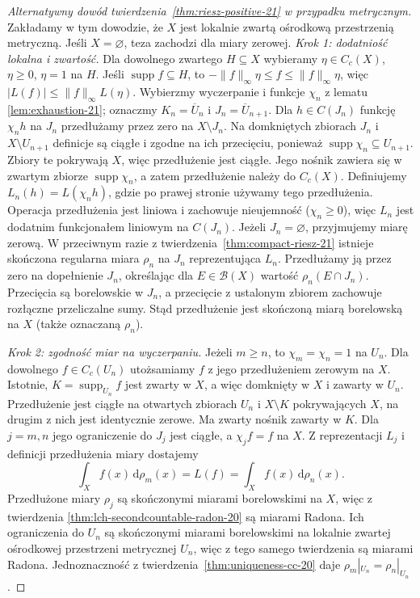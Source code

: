 \begin{proof}[Alternatywny dowód twierdzenia~\ref{thm:riesz-positive-21} w przypadku metrycznym]
Zakładamy w tym dowodzie, że $X$ jest lokalnie zwartą ośrodkową przestrzenią metryczną.
Jeśli $X=\varnothing$, teza zachodzi dla miary zerowej.
\emph{Krok 1: dodatniość lokalna i zwartość.}
Dla dowolnego zwartego $H\subseteq X$ wybieramy
$\eta\in C_c(X)$, $\eta\ge0$, $\eta=1$ na $H$.
Jeśli $\operatorname{supp}f\subseteq H$, to
$-\|f\|_\infty\eta\le f\le\|f\|_\infty\eta$,
więc $|L(f)|\le\|f\|_\infty L(\eta)$.
Wybierzmy wyczerpanie i funkcje $\chi_n$ z lematu
\ref{lem:exhaustion-21}; oznaczmy $K_n=\overline U_n$
i $J_n=\overline U_{n+1}$.
Dla $h\in C(J_n)$ funkcję $\chi_nh$ na $J_n$
przedłużamy przez zero na $X\setminus J_n$.
Na domkniętych zbiorach $J_n$ i $X\setminus U_{n+1}$
definicje są ciągłe i zgodne na ich przecięciu,
ponieważ $\operatorname{supp}\chi_n\subseteq U_{n+1}$.
Zbiory te pokrywają $X$, więc przedłużenie jest ciągłe.
Jego nośnik zawiera się w zwartym zbiorze
$\operatorname{supp}\chi_n$, a zatem przedłużenie
należy do $C_c(X)$. Definiujemy $L_n(h)=L(\chi_nh)$,
gdzie po prawej stronie używamy tego przedłużenia.
Operacja przedłużenia jest liniowa i zachowuje
nieujemność ($\chi_n\ge0$), więc $L_n$ jest dodatnim
funkcjonałem liniowym na $C(J_n)$.
Jeżeli $J_n=\varnothing$, przyjmujemy miarę zerową.
W przeciwnym razie z twierdzenia~\ref{thm:compact-riesz-21}
istnieje skończona regularna miara $\rho_n$
na $J_n$ reprezentująca $L_n$. Przedłużamy ją
przez zero na dopełnienie $J_n$, określając dla
$E\in\mathcal B(X)$ wartość $\rho_n(E\cap J_n)$.
Przecięcia są borelowskie w $J_n$, a przecięcie
z ustalonym zbiorem zachowuje rozłączne przeliczalne
sumy. Stąd przedłużenie jest skończoną miarą
borelowską na $X$ (także oznaczaną $\rho_n$).

\emph{Krok 2: zgodność miar na wyczerpaniu.}
Jeżeli $m\ge n$, to $\chi_m=\chi_n=1$ na $U_n$.
Dla dowolnego $f\in C_c(U_n)$ utożsamiamy $f$
z jego przedłużeniem zerowym na $X$. Istotnie,
$K=\operatorname{supp}_{U_n}f$ jest zwarty w $X$,
a więc domknięty w $X$ i zawarty w $U_n$.
Przedłużenie jest ciągłe na otwartych zbiorach
$U_n$ i $X\setminus K$ pokrywających $X$,
na drugim z nich jest identycznie zerowe.
Ma zwarty nośnik zawarty w $K$. Dla $j=m,n$
jego ograniczenie do $J_j$ jest ciągłe, a
$\chi_j f=f$ na $X$. Z reprezentacji $L_j$ i definicji
przedłużenia miary dostajemy
\[
 \int_X f(x)\,\mathrm d\rho_m(x)=L(f)
  =\int_X f(x)\,\mathrm d\rho_n(x).
\]
Przedłużone miary $\rho_j$ są skończonymi miarami
borelowskimi na $X$, więc z twierdzenia
\ref{thm:lch-secondcountable-radon-20} są miarami Radona.
Ich ograniczenia do $U_n$ są skończonymi miarami
borelowskimi na lokalnie zwartej ośrodkowej przestrzeni
metrycznej $U_n$, więc z tego samego twierdzenia są
miarami Radona.
Jednoznaczność z twierdzenia~\ref{thm:uniqueness-cc-20}
daje $\rho_m|_{U_n}=\rho_n|_{U_n}$.



\end{proof}
